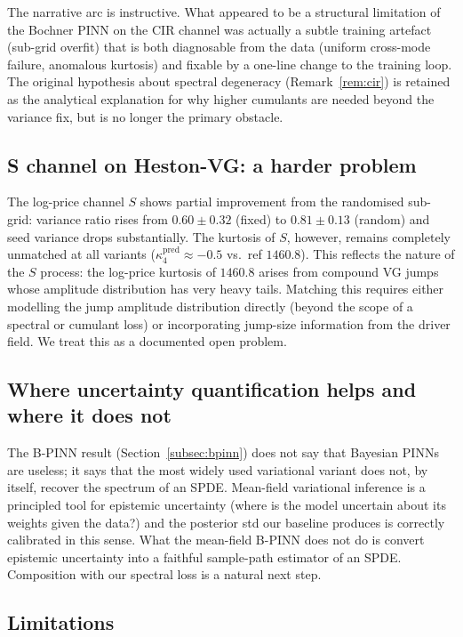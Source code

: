 \documentclass[review,12pt]{elsarticle}
\begin{document}
The narrative arc is instructive. What appeared to be a structural
limitation of the Bochner PINN on the CIR channel was actually a
subtle training artefact (sub-grid overfit) that is both
diagnosable from the data (uniform cross-mode failure, anomalous
kurtosis) and fixable by a one-line change to the training loop.
The original hypothesis about spectral degeneracy (Remark~\ref{rem:cir})
is retained as the analytical explanation for why higher cumulants
are needed beyond the variance fix, but is no longer the primary
obstacle.

\subsection{S channel on Heston-VG: a harder problem}

The log-price channel \(S\) shows partial improvement from the
randomised sub-grid: variance ratio rises from \(0.60 \pm 0.32\)
(fixed) to \(0.81 \pm 0.13\) (random) and seed variance drops
substantially. The kurtosis of \(S\), however, remains completely
unmatched at all variants (\(\kappa_4^{\mathrm{pred}} \approx -0.5\)
vs.\ ref \(1460.8\)). This reflects the nature of the \(S\)
process: the log-price kurtosis of \(1460.8\) arises from
compound VG jumps whose amplitude distribution has very heavy tails.
Matching this requires either modelling the jump amplitude
distribution directly (beyond the scope of a spectral or cumulant
loss) or incorporating jump-size information from the driver field.
We treat this as a documented open problem.

\subsection{Where uncertainty quantification helps and where it does not}

The B-PINN result (Section~\ref{subsec:bpinn}) does not say that
Bayesian PINNs are useless; it says that the most widely used
variational variant does not, by itself, recover the spectrum of
an SPDE. Mean-field variational inference is a principled tool for
epistemic uncertainty (where is the model uncertain about its
weights given the data?) and the posterior std our baseline
produces is correctly calibrated in this sense. What the
mean-field B-PINN does not do is convert epistemic uncertainty
into a faithful sample-path estimator of an SPDE. Composition with
our spectral loss is a natural next step.

\subsection{Limitations}
\end{document}
